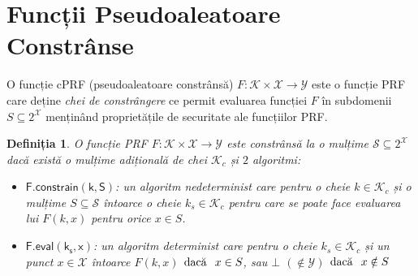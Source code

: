 \documentclass[oneside, 12pt]{book}
\newtheorem{definitie}{\textbf{Definiția}}[section]
\begin{document}
\section{Funcții Pseudoaleatoare Constrânse}
\label{subsec:cprf}

O funcție cPRF (pseudoaleatoare constrânsă) $F : \mathcal{K} \times \mathcal{X} \rightarrow \mathcal{Y}$ este o funcție PRF care deține \textit{chei de constrângere} ce permit evaluarea funcției $F$ în subdomenii $S \subseteq 2^{\mathcal{X}}$ menținând proprietățile de securitate ale funcțiilor PRF.
\\
\begin{definitie}
\label{def:cprf}
	O funcție PRF $F : \mathcal{K} \times \mathcal{X} \rightarrow \mathcal{Y}$ este constrânsă la o mulțime $\mathcal{S} \subseteq 2^{\mathcal{X}}$ dacă există o mulțime adițională de chei $\mathcal{K}_c$ și $2$ algoritmi:
	\begin{itemize}
		\item $\mathsf{F.constrain(k, S)}$: un algoritm nedeterminist care pentru o cheie $k \in \mathcal{K}_c$ și o mulțime $S \subseteq \mathcal{S}$ întoarce o cheie $k_s \in \mathcal{K}_c$ pentru care se poate face evaluarea lui $F(k, x)$ pentru orice $x \in S$.
		\item $\mathsf{F.eval(k_s, x)}$: un algoritm determinist care pentru o cheie $k_s \in \mathcal{K}_c$ și un punct $x \in \mathcal{X}$ întoarce $F(k, x)$  $\mbox{dacă} \hspace{.1in} x \in S$, sau $\bot$ $(\not \in \mathcal{Y})$ $\mbox{dacă} \hspace{.1in} x \notin S$
	\end{itemize}
\end{definitie}
\end{document}
